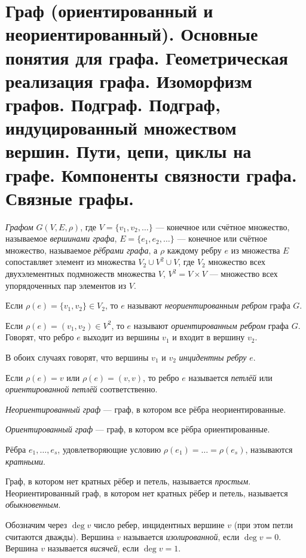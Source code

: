 \section{Граф (ориентированный и неориентированный). Основные понятия для графа. Геометрическая реализация графа. Изоморфизм графов. Подграф. Подграф, индуцированный множеством вершин. Пути, цепи, циклы на графе. Компоненты связности графа. Связные графы.}

\begin{definition}
    \textit{Графом} $G(V, E, \rho)$, где $V = \{v_1, v_2, \ldots\}$ --- конечное или счётное множество, называемое \textit{вершинами графа}, $E = \{e_1, e_2, \ldots \}$ --- конечное или счётное множество, называемое \textit{рёбрами графа}, а $\rho$ каждому ребру $e$ из множества $E$ сопоставляет элемент из множества $V_2 \cup V^2 \cup V$, где $V_2$ множество всех двухэлементных подмножеств множества $V$, $V^2 = V \times V$ --- множество всех упорядоченных пар элементов из $V$.
\end{definition}

Если $\rho(e) = \{v_1, v_2\} \in V_2$, то $e$ называют \textit{неориентированным ребром} графа $G$.

Если $\rho(e) = (v_1, v_2) \in V^2$, то $e$ называют \textit{ориентированным ребром} графа $G$. Говорят, что ребро $e$ выходит из вершины $v_1$ и входит в вершину $v_2$.

В обоих случаях говорят, что вершины $v_1$ и $v_2$ \textit{инцидентны ребру} $e$.

Если $\rho(e) = v$ или $\rho(e) = (v,v)$, то ребро $e$ называется \textit{петлёй} или \textit{ориентированной петлёй} соответственно.


\begin{definition}
    \textit{Неориентированный граф} --- граф, в котором все рёбра неориентированные.
\end{definition}

\begin{definition}
    \textit{Ориентированный граф} --- граф, в котором все рёбра ориентированные.
\end{definition}

Рёбра $e_1, \ldots, e_s$, удовлетворяющие условию $\rho(e_1) = \ldots = \rho(e_s)$, называются \textit{кратными}.

Граф, в котором нет кратных рёбер и петель, называется \textit{простым}. Неориентированный граф, в котором нет кратных рёбер и петель, называется \textit{обыкновенным}.

Обозначим через $\deg v$ число ребер, инцидентных вершине $v$ (при этом петли считаются дважды). Вершина $v$ называется \textit{изолированной}, если $\deg v = 0$. Вершина $v$ называется \textit{висячей}, если $\deg v = 1$.


